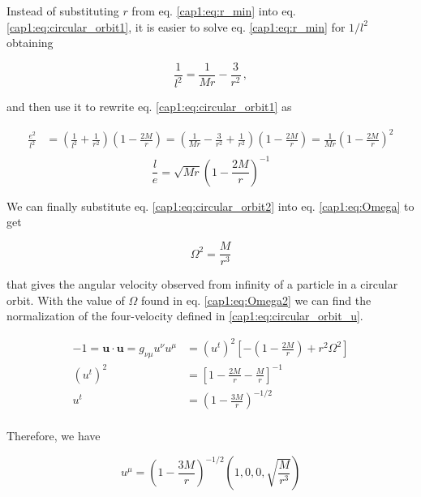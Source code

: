 Instead of substituting $r$ from eq. \ref{cap1:eq:r_min} into eq.
\ref{cap1:eq:circular_orbit1}, it is easier to solve eq. \ref{cap1:eq:r_min} for
$1 / l^2$ obtaining

\begin{equation}
    \frac{1}{l^2} = \frac{1}{M r} - \frac{3}{r^2} \, ,
\end{equation}

and then use it to rewrite eq. \ref{cap1:eq:circular_orbit1} as

\begin{align*}
    \frac{e^2}{l^2} &= \left(\frac{1}{l^2} + \frac{1}{r^2} \right)
    \left(1 - \frac{2M}{r}\right)
    = \left(\frac{1}{M r}
    - \frac{3}{r^2}
    + \frac{1}{r^2}\right)
    \left(1 - \frac{2M}{r}\right) 
    = \frac{1}{M r} \left(1
    - \frac{2 M}{r} \right)^2 \\
\end{align*}
\begin{equation}
    \frac{l}{e} = \sqrt{M r} \left(1
    - \frac{2 M}{r} \right)^{-1}
    \label{cap1:eq:circular_orbit2}
\end{equation}

We can finally substitute eq. \ref{cap1:eq:circular_orbit2} into eq.
\ref{cap1:eq:Omega} to get

\begin{equation}
    \Omega^2 = \frac{M}{r^3}
    \label{cap1:eq:Omega2}
\end{equation}

that gives the angular velocity observed from infinity of a particle in a
circular orbit.
With the value of $\Omega$ found in eq. \ref{cap1:eq:Omega2} we can find the
normalization of the four-velocity defined in \ref{cap1:eq:circular_orbit_u}.

\begin{align*}
    - 1 = \mathbf{u \cdot u} = g_{\nu \mu} u^\nu u^\mu
    &= (u^t)^2 \left[- \left(1 - \frac{2M}{r}\right) + r^2 \Omega^2 \right] \\
    (u^t)^2 &= \left[ 1 - \frac{2M}{r} - \frac{M}{r}\right]^{-1} \\
    u^t &= \left( 1 - \frac{3M}{r} \right)^{-1/2} \\
\end{align*}

Therefore, we have

\begin{equation}
    u^\mu = \left( 1 - \frac{3M}{r} \right)^{-1/2}
    \left( 1, 0, 0, \sqrt{\frac{M}{r^3}} \right)
\end{equation}


